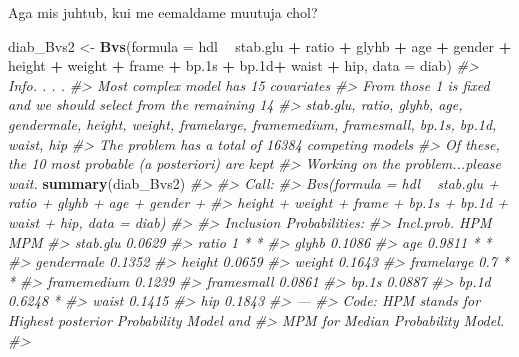 \documentclass[]{book}
\newenvironment{Shaded}{\begin{snugshade}}{\end{snugshade}}
\newcommand{\CommentTok}[1]{\textcolor[rgb]{0.56,0.35,0.01}{\textit{#1}}}
\newcommand{\DataTypeTok}[1]{\textcolor[rgb]{0.13,0.29,0.53}{#1}}
\newcommand{\FloatTok}[1]{\textcolor[rgb]{0.00,0.00,0.81}{#1}}
\newcommand{\KeywordTok}[1]{\textcolor[rgb]{0.13,0.29,0.53}{\textbf{#1}}}
\newcommand{\NormalTok}[1]{#1}
\newcommand{\OperatorTok}[1]{\textcolor[rgb]{0.81,0.36,0.00}{\textbf{#1}}}
\newcommand{\StringTok}[1]{\textcolor[rgb]{0.31,0.60,0.02}{#1}}
\begin{document}
Aga mis juhtub, kui me eemaldame muutuja chol?

\begin{Shaded}
\begin{Highlighting}[]
\NormalTok{diab_Bvs2 <-}\StringTok{ }\KeywordTok{Bvs}\NormalTok{(}\DataTypeTok{formula =}\NormalTok{ hdl }\OperatorTok{~}\StringTok{ }\NormalTok{stab.glu }\OperatorTok{+}\StringTok{ }\NormalTok{ratio }\OperatorTok{+}\StringTok{ }\NormalTok{glyhb }\OperatorTok{+}\StringTok{ }\NormalTok{age }\OperatorTok{+}\StringTok{ }\NormalTok{gender }\OperatorTok{+}\StringTok{ }\NormalTok{height }\OperatorTok{+}\StringTok{ }\NormalTok{weight }\OperatorTok{+}\StringTok{ }\NormalTok{frame }\OperatorTok{+}\StringTok{ }\NormalTok{bp}\FloatTok{.1}\NormalTok{s }\OperatorTok{+}\StringTok{ }\NormalTok{bp}\FloatTok{.1}\NormalTok{d}\OperatorTok{+}\StringTok{ }\NormalTok{waist }\OperatorTok{+}\StringTok{ }\NormalTok{hip, }\DataTypeTok{data =}\NormalTok{ diab)}
\CommentTok{#> Info. . . .}
\CommentTok{#> Most complex model has 15 covariates}
\CommentTok{#> From those 1 is fixed and we should select from the remaining 14 }
\CommentTok{#> stab.glu, ratio, glyhb, age, gendermale, height, weight, framelarge, framemedium, framesmall, bp.1s, bp.1d, waist, hip}
\CommentTok{#> The problem has a total of 16384 competing models}
\CommentTok{#> Of these, the  10 most probable (a posteriori) are kept}
\CommentTok{#> Working on the problem...please wait.}
\KeywordTok{summary}\NormalTok{(diab_Bvs2)}
\CommentTok{#> }
\CommentTok{#> Call:}
\CommentTok{#> Bvs(formula = hdl ~ stab.glu + ratio + glyhb + age + gender + }
\CommentTok{#>     height + weight + frame + bp.1s + bp.1d + waist + hip, data = diab)}
\CommentTok{#> }
\CommentTok{#> Inclusion Probabilities:}
\CommentTok{#>             Incl.prob. HPM MPM}
\CommentTok{#> stab.glu        0.0629        }
\CommentTok{#> ratio                1   *   *}
\CommentTok{#> glyhb           0.1086        }
\CommentTok{#> age             0.9811   *   *}
\CommentTok{#> gendermale      0.1352        }
\CommentTok{#> height          0.0659        }
\CommentTok{#> weight          0.1643        }
\CommentTok{#> framelarge         0.7   *   *}
\CommentTok{#> framemedium     0.1239        }
\CommentTok{#> framesmall      0.0861        }
\CommentTok{#> bp.1s           0.0887        }
\CommentTok{#> bp.1d           0.6248       *}
\CommentTok{#> waist           0.1415        }
\CommentTok{#> hip             0.1843        }
\CommentTok{#> ---}
\CommentTok{#> Code: HPM stands for Highest posterior Probability Model and}
\CommentTok{#>  MPM for Median Probability Model.}
\CommentTok{#> }
\end{Highlighting}
\end{Shaded}
\end{document}
